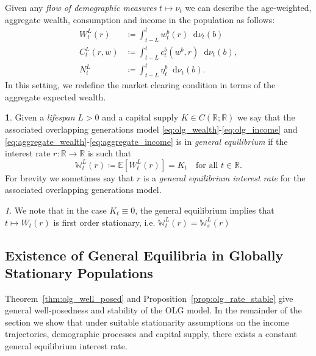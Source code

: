 \documentclass[11pt,oneside,english,reqno,dvipsnames,table]{amsart}
\numberwithin{equation}{section}
\theoremstyle{plain}
\theoremstyle{definition}
\newtheorem{defn}[thm]{\protect\definitionname}
\theoremstyle{remark}
\newtheorem{rem}[thm]{\protect\remarkname}
\theoremstyle{plain}
\newtheorem{lem}[thm]{\protect\lemmaname}
\theoremstyle{plain}
\theoremstyle{plain}
\theoremstyle{plain}
\theoremstyle{plain}
\theoremstyle{plain}
\theoremstyle{plain}
\providecommand{\definitionname}{Definition}
\providecommand{\lemmaname}{Lemma}
\providecommand{\remarkname}{Remark}
\providecommand{\remarkname}{Remark}
\newcommand{\RR}{\mathbb{R}}
\newcommand{\dd}{\mathop{}\!\mathrm{d}}
\newcommand{\mbE}{\mathbb{E}}
\newcommand{\mbR}{\mathbb{R}}
\newcommand{\mbW}{\mathbb{W}}
\numberwithin{thm}{section}
\begin{document}
Given any \emph{flow of demographic measures} $t\mapsto \nu_t$ we can describe the age-weighted, aggregate wealth, consumption and income in the population as follows: 
%
\begin{align}
    W^L_t(r) &\coloneqq \int_{t-L}^{t} w_t^{b}(r) \dd \nu_t(b)\label{eq:aggregate_wealth}\\
    C^L_t(r,w) &\coloneqq \int_{t-L}^t c^{b}_t(w^b,r) \dd \nu_t(b) , \label{eq:aggregate_consumption} \\
    N^L_t &\coloneqq \int_{t-L}^t \eta^{b}_t \dd \nu_t(b). \label{eq:aggregate_income} 
\end{align}
%
In this setting, we redefine the market clearing condition in terms of the aggregate expected wealth.

%
\begin{defn}\label{def:olg_clearing_rate}
    Given a \emph{lifespan} $L>0$ and a capital supply $K\in C(\RR;\RR)$  we say that the associated overlapping generations model \eqref{eq:olg_wealth}-\eqref{eq:olg_income} and \eqref{eq:aggregate_wealth}-\eqref{eq:aggregate_income} is in \emph{general equilibrium} if the interest rate $r:\mbR\to \mbR$ is such that
    \begin{equation}\label{eq:olg_clearing}
        \mbW^L_t(r) \coloneqq \mbE\left[W^L_t(r)\right] = K_t \quad \text{for all}\,\, t\in \mbR.
        \end{equation}
        For brevity we sometimes say that $r$ is a \emph{general equilibrium interest rate} for the associated overlapping generations model.
\end{defn}
\begin{rem}
    We note that in the case $K_t\equiv 0$, the general equilibrium implies that $t\mapsto W_t(r)$ is first order stationary, i.e. $ \mbW^L_t(r)=\mbW^L_s(r)$  
\end{rem}






\subsection{Existence of General Equilibria in Globally Stationary Populations}\label{sec:olg_stationary_populations}
%
Theorem~\ref{thm:olg_well_posed} and Proposition~\ref{prop:olg_rate_stable} give general well-posedness and stability of the OLG model. In the remainder of the section we show that under suitable stationarity assumptions on the income trajectories, demographic processes and capital supply, there exists a constant general equilibrium interest rate.
\end{document}
